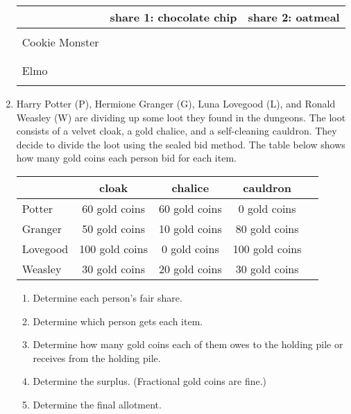 \documentclass[12pt]{article}
\begin{document}
\begin{enumerate}
\begin{tabular}{l | c | c}
&share 1: chocolate chip &share 2: oatmeal \\
\hline
&&\\
Cookie Monster&&\\
&&\\
\hline
&&\\
Elmo&&\\ &&\\
\end{tabular}

\vfill
	
	
\item Harry Potter (P), Hermione Granger (G), Luna Lovegood (L), and Ronald Weasley (W) are dividing up some loot they found in the dungeons. The loot consists of a velvet cloak, a gold chalice, and a self-cleaning cauldron. They decide to divide the loot using the sealed bid method. The table below shows how many gold coins each person bid for each item.\\

\begin{tabular}{l || c|c|c|c}
&cloak&chalice&cauldron\\
\hline \hline
Potter&60 gold coins&60 gold coins&0 gold coins\\
\hline
Granger&50 gold coins&10 gold coins&80 gold coins\\
\hline
Lovegood&100 gold coins&0 gold coins&100 gold coins\\
\hline
Weasley&30 gold coins&20 gold coins& 30 gold coins\\
\end{tabular}
	\begin{enumerate}
	\item Determine each person's fair share.
	\vfill
	\item Determine which person gets each item.
	\vfill
	\item Determine how many gold coins each of them owes to the holding pile or receives from the holding pile.
	
	\vfill
	\newpage
	\item Determine the surplus. (Fractional gold coins are fine.)
	\vfill
	\item Determine the final allotment.
	\vfill
	\end{enumerate}
\end{enumerate}
\end{document}
